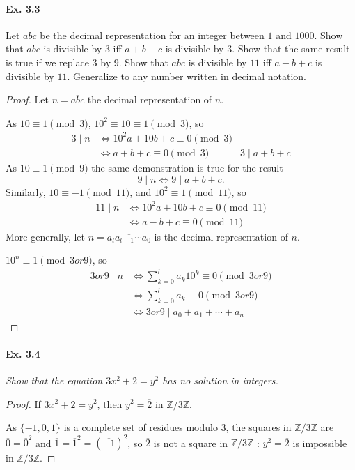 \documentclass[11pt,a4paper]{article}
\newcommand{\Z}{\mathbb{Z}}
\begin{document}
{{\it \paragraph{Ex. 3.3}
Let $abc$ be the decimal representation for an integer between $1$ and $1000$. Show that $abc$ is divisible by $3$ iff $a + b + c$ is divisible by $3$. Show that the same result is true if we replace $3$ by $9$. Show that $abc$ is divisible by $11$ iff $a - b + c$ is divisible by $11$.  Generalize to any number written in decimal notation.
}

\begin{proof}
Let $n = \overline{abc}$ the decimal representation of $n$. 

As $10 \equiv 1 \pmod 3$, $10^2 \equiv 10 \equiv 1 \pmod 3$, so
\begin{align*}
3 \mid n &\iff 10^2 a + 10 b + c \equiv 0 \pmod 3\\ 
&\iff a+b+c \equiv 0 \pmod 3
& 3 \mid a+b+ c
\end{align*}
As $10 \equiv 1 \pmod 9$ the same demonstration is true for the result
$$9 \mid n \iff 9 \mid a+b+c.$$
Similarly, $10 \equiv -1 \pmod {11}$, and $10^2 \equiv 1 \pmod {11}$, so
\begin{align*}
11 \mid n &\iff 10^2 a + 10 b + c \equiv 0 \pmod {11}\\ 
&\iff a-b+c \equiv 0 \pmod {11}
\end{align*}
More generally, let $n = \overline{a_la_{l-1}\cdots a_0}$ is the decimal representation of $n$. 

$10^n \equiv 1 \pmod {3 or 9}$, so
\begin{align*}
3 or 9 \mid n &\iff \sum_{k=0}^l a_k 10^k \equiv 0 \pmod {3 or 9}\\
&\iff \sum_{k=0}^l a_k \equiv 0 \pmod {3 or 9}\\
&\iff 3 or 9 \mid a_0+a_1+\cdots +a_n
\end{align*}
\end{proof}

\paragraph{Ex. 3.4}

{\it Show that the equation $3x^2 + 2 = y^2$ has no solution in integers.
}

\begin{proof}
If $3x^2+2 = y^2$, then  $\overline{y}^2 = \overline{2}$ in $\Z/3\Z$.


As $\{-1,0,1\}$ is a complete set of residues modulo $3$, the squares in $\Z/3\Z$ are $\overline{0} = \overline{0}^2$ and  $\overline{1} = \overline{1}^2 = (\overline{-1})^2$, so $\overline{2}$ is not a square in $\Z/3\Z$ : $\overline{y}^2 = \overline{2}$ is impossible in $\Z/3\Z$.


\end{proof}}
\end{document}
